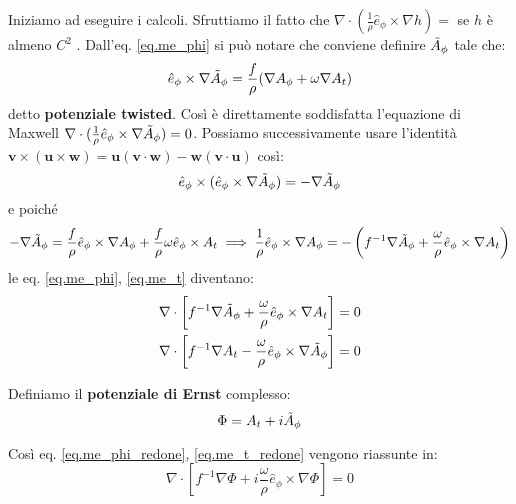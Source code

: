 Iniziamo ad eseguire i calcoli. Sfruttiamo il fatto che $\nabla \cdot (\frac{1}{\rho}\hat{e}_\phi \times \nabla h) = $ se $h$ è almeno $C^2$ .
Dall'eq. \ref{eq.me_phi} si può notare che conviene definire $\Tilde{A}_\phi$ tale che:
\begin{equation}
   \hat{e}_\phi \times \nabla\Tilde{A}_\phi = \frac{f}{\rho}(\nabla A_\phi + \omega \nabla A_t )
   \label{eq.potenziale_twisted}
\end{equation}
detto \textbf{potenziale twisted}. Così è direttamente soddisfatta l'equazione di Maxwell $\nabla\cdot(\frac{1}{\rho}\hat{e}_\phi \times \nabla\Tilde{A}_\phi )= 0$. Possiamo successivamente usare l'identità $\bm{v}\times(\bm{u}\times\bm{w}) = \bm{u}(\bm{v}\cdot\bm{w}) - \bm{w}(\bm{v}\cdot\bm{u})$ così:
\begin{equation*}
    \hat{e}_\phi \times (\hat{e}_\phi \times \nabla \Tilde{A}_\phi ) = - \nabla\Tilde{A}_\phi
\end{equation*}
e poiché
\begin{equation*}
    -\nabla\Tilde{A}_\phi = \frac{f}{\rho}\hat{e}_\phi \times \nabla A_\phi  + \frac{f}{\rho} \omega \hat{e}_\phi \times A_t \implies \frac{1}{\rho}\hat{e}_\phi \times \nabla A_\phi = - \left( f^{-1}\nabla \Tilde{A}_\phi + \frac{\omega}{\rho}\hat{e}_\phi \times \nabla A_t \right)
\end{equation*}
le eq. \ref{eq.me_phi}, \ref{eq.me_t} diventano:
\begin{align}
    \nabla\cdot\left[ f^{-1}\nabla \Tilde{A}_\phi + \frac{\omega}{\rho}\hat{e}_\phi \times \nabla A_t \right] = 0 \label{eq.me_phi_redone} \\
    \nabla\cdot\left[ f^{-1}\nabla A_t - \frac{\omega}{\rho}\hat{e}_\phi \times \nabla\Tilde{A}_\phi \right] = 0 \label{eq.me_t_redone}
\end{align}
\begin{definizione}
Definiamo il \textbf{potenziale di Ernst} complesso:
\begin{equation}
    \Phi = A_t + i\Tilde{A}_\phi
    \label{eq.potenziale_ernst_phi}
\end{equation}
\end{definizione}
Così eq. \ref{eq.me_phi_redone}, \ref{eq.me_t_redone} vengono riassunte in:
\begin{equation}
    \nabla\cdot\left[ f^{-1}\nabla\Phi + i\frac{\omega}{\rho}\hat{e}_\phi \times \nabla\Phi \right] = 0
    \label{eq.ernst_0}
\end{equation}

